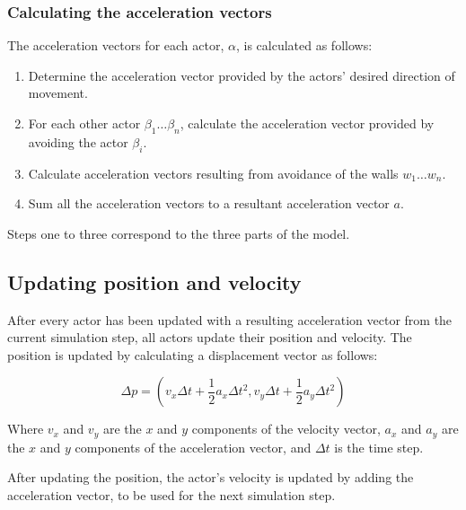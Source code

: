 \subsubsection{Calculating the acceleration vectors}
The acceleration vectors for each actor, $\alpha$, is calculated as follows:

\begin{enumerate}
    \item Determine the acceleration vector provided by the actors' desired 
        direction of movement.
    \item For each other actor $\beta_1\dots\beta_n$, calculate the 
        acceleration vector provided by avoiding the actor $\beta_i$.
    \item Calculate acceleration vectors resulting from avoidance of the walls 
        $w_1\dots w_n$.
    \item Sum all the acceleration vectors to a resultant acceleration vector 
        $a$.
\end{enumerate}

Steps one to three correspond to the three parts of the model.

\subsection{Updating position and velocity}
After every actor has been updated with a resulting acceleration vector from 
the current simulation step, all actors update their position and velocity.  
The position is updated by calculating a displacement vector as follows:

\begin{equation}
    \Delta p = (v_x \Delta t + \frac{1}{2}a_x \Delta t^2, v_y \Delta t + 
    \frac{1}{2}a_y \Delta t^2)
\end{equation}

Where $v_x$ and $v_y$ are the $x$ and $y$ components of the velocity vector, 
$a_x$ and $a_y$ are the $x$ and $y$ components of the acceleration vector, and 
$\Delta t$ is the time step.

After updating the position, the actor's velocity is updated by adding the 
acceleration vector, to be used for the next simulation step.

%
%
%
%
%
%
%

